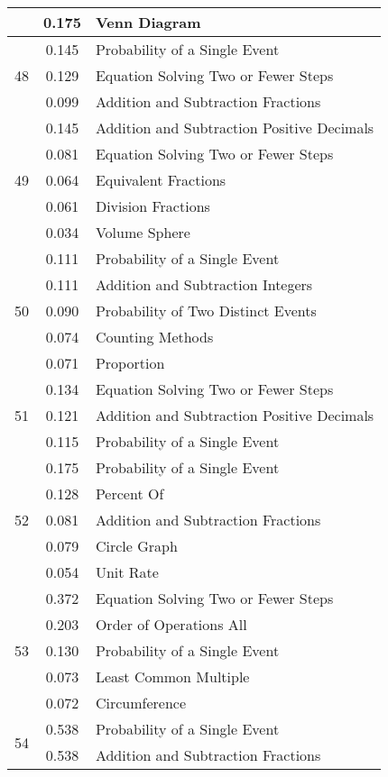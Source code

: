 \begin{longtable}[c]{|c|c|l|}
 & 0.175 & Venn Diagram \\
\hline
\multirow{3}{*}{48} & 0.145 & Probability of a Single Event \\
 & 0.129 & Equation Solving Two or Fewer Steps \\
 & 0.099 & Addition and Subtraction Fractions \\
\hline
\multirow{5}{*}{49} & 0.145 & Addition and Subtraction Positive Decimals \\
 & 0.081 & Equation Solving Two or Fewer Steps \\
 & 0.064 & Equivalent Fractions \\
 & 0.061 & Division Fractions \\
 & 0.034 & Volume Sphere \\
\hline
\multirow{5}{*}{50} & 0.111 & Probability of a Single Event \\
 & 0.111 & Addition and Subtraction Integers \\
 & 0.090 & Probability of Two Distinct Events \\
 & 0.074 & Counting Methods \\
 & 0.071 & Proportion \\
\hline
\multirow{3}{*}{51} & 0.134 & Equation Solving Two or Fewer Steps \\
 & 0.121 & Addition and Subtraction Positive Decimals \\
 & 0.115 & Probability of a Single Event \\
\hline
\multirow{5}{*}{52} & 0.175 & Probability of a Single Event \\
 & 0.128 & Percent Of \\
 & 0.081 & Addition and Subtraction Fractions \\
 & 0.079 & Circle Graph \\
 & 0.054 & Unit Rate \\
\hline
\multirow{5}{*}{53} & 0.372 & Equation Solving Two or Fewer Steps \\
 & 0.203 & Order of Operations All \\
 & 0.130 & Probability of a Single Event \\
 & 0.073 & Least Common Multiple \\
 & 0.072 & Circumference  \\
\hline
\multirow{2}{*}{54} & 0.538 & Probability of a Single Event \\
 & 0.538 & Addition and Subtraction Fractions \\
\hline
\end{longtable}


